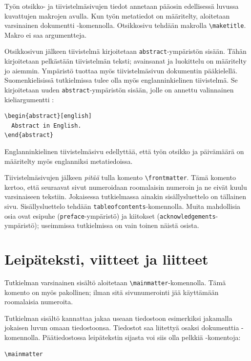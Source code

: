 Työn otsikko- ja tiivistelmäsivujen tiedot annetaan pääosin edellisessä luvussa kuvattujen makrojen avulla. Kun työn metatiedot on määritelty, aloitetaan varsinainen dokumentti \verb++-komennolla. Otsikkosivu tehdään makrolla \verb+\maketitle+. Makro ei saa argumentteja.

  Otsikkosivun jälkeen tiivistelmä kirjoitetaan \texttt{abstract}-ympäristön sisään. Tähän kirjoitetaan pelkästään tiivistelmän teksti; avainsanat ja luokittelu on määritelty jo aiemmin. Ympäristö tuottaa myös tiivistelmäsivun dokumentin pääkielellä. Suomenkielisissä tutkielmissa tulee olla myös englanninkielinen tiivistelmä. Se kirjoitetaan uuden \texttt{abstract}-ympäristön sisään, jolle on annettu valinnainen kieliargumentti :
\begin{verbatim}
\begin{abstract}[english]
  Abstract in English.
\end{abstract}
\end{verbatim}

  Englanninkielinen tiivistelmäsivu edellyttää, että työn otsikko ja päivämäärä on määritelty myös englanniksi metatiedoissa.
  
  Tiivistelmäsivujen jälkeen \emph{pitää} tulla komento \verb+\frontmatter+. Tämä komento kertoo, että seuraavat sivut numeroidaan roomalaisin numeroin ja ne eivät kuulu varsinaiseen tekstiin. Jokaisessa tutkielmassa ainakin sisällysluettelo on tällainen sivu. Sisällysluettelo tehdään \verb+tableofcontents+-komennolla. Muita mahdollisia osia ovat esipuhe (\texttt{preface}-ympäristö) ja kiitokset (\texttt{acknowledgements}-ympäristö); useimmissa tutkielmissa on vain toinen näistä osista.

\section{Leipäteksti, viitteet ja liitteet}
\label{sec:latex:mainmatter_backmatter}

Tutkielman varsinainen sisältö aloitetaan \verb+\mainmatter+-komennolla. Tämä komento on myös pakollinen; ilman sitä sivunumerointi jää käyttämään roomalaisia numeroita.

Tutkielman sisältö kannattaa jakaa useaan tiedostoon esimerkiksi jakamalla jokaisen luvun omaan tiedostoonsa. Tiedostot saa liitettyä osaksi dokumenttia \verb++-komennolla. Päätiedostossa leipätekstin sijasta voi siis olla pelkkiä \verb++-komentoja:
\begin{verbatim}
\mainmatter





\end{verbatim}

